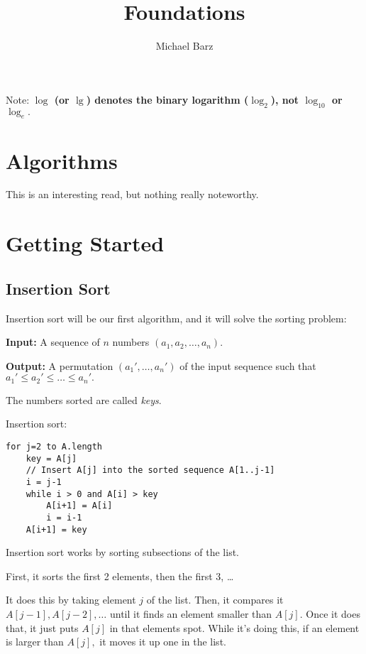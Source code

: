 \documentclass{article}
\title{Foundations}
\author{Michael Barz}
\begin{document}
\maketitle

\tableofcontents
\newpage

Note: \textbf{$\log$ (or $\lg$) denotes the binary logarithm ($\log_2$), not $\log_{10}$ or $\log_e.$}

\section{Algorithms}

This is an interesting read, but nothing really noteworthy.

\section{Getting Started}

\subsection{Insertion Sort}

	Insertion sort will be our first algorithm, and it will solve the sorting problem:
\begin{tcolorbox}[title=Sorting Problem]
	\textbf{Input:} A sequence of $n$ numbers $(a_1, a_2, \dots, a_n).$

	\textbf{Output:} A permutation $(a_1', \dots, a_n')$ of the input sequence such that $a_1' \leq a_2' \leq \dots \leq a_n'.$
\end{tcolorbox}

\vspace{2mm}

The numbers sorted are called \textit{keys}.

Insertion sort:

\begin{lstlisting}
for j=2 to A.length
	key = A[j]
	// Insert A[j] into the sorted sequence A[1..j-1]
	i = j-1
	while i > 0 and A[i] > key
		A[i+1] = A[i]
		i = i-1
	A[i+1] = key
\end{lstlisting}

Insertion sort works by sorting subsections of the list.

First, it sorts the first 2 elements, then the first 3, \dots

It does this by taking element $j$ of the list. Then, it compares it $A[j-1], A[j-2], \dots$ until it finds an element smaller than $A[j].$ Once it does that, it just puts $A[j]$ in that elements spot. While it's doing this, if an element is larger than $A[j],$ it moves it up one in the list.
\end{document}
